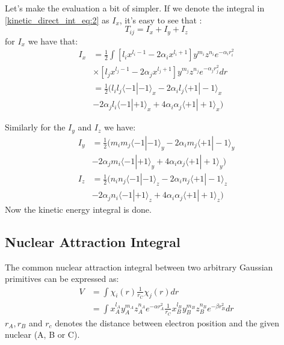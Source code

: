 Let's make the evaluation a bit of simpler. If we denote the integral in \ref{kinetic_direct_int_eq:2} 
as $I_{x}$, it's easy to see that :
\begin{equation}
 T_{ij} = I_{x} + I_{y} + I_{z}
\end{equation}
for $I_{x}$ we have that:
\begin{equation}
 \label{kinetic_direct_int_eq:3}
\begin{split}
 I_{x} &=\frac{1}{2}   \int 
          \left[ l_{i}x^{l_{i}-1} - 2\alpha_{i}x^{l_{i}+1}\right]
          y^{m_{i}}z^{n_{i}}e^{-\alpha_{i} r_{i}^{2}} \\
       &\times
          \left[ l_{j}x^{l_{j}-1} - 2\alpha_{j}x^{l_{j}+1}\right]
          y^{m_{j}}z^{n_{j}}e^{-\alpha_{j} r_{j}^{2}} dr \\
       &= \frac{1}{2}\Big(
          l_{i}l_{j}\langle -1|-1\rangle_{x} 
        - 2\alpha_{i}l_{j}\langle +1|-1\rangle_{x}    \\
       &- 2\alpha_{j}l_{i}\langle -1|+1\rangle_{x}
        + 4\alpha_{i}\alpha_{j}\langle +1|+1\rangle_{x} 
          \Big) 
\end{split}
\end{equation}

Similarly for the $I_{y}$ and $I_{z}$ we have:
\begin{equation}
\label{kinetic_direct_int_eq:4}
\begin{split}
I_{y} &=  \frac{1}{2}\Big(
          m_{i}m_{j}\langle -1|-1\rangle_{y} 
        - 2\alpha_{i}m_{j}\langle +1|-1\rangle_{y}   \\ 
       &- 2\alpha_{j}m_{i}\langle -1|+1\rangle_{y}
        + 4\alpha_{i}\alpha_{j}\langle +1|+1\rangle_{y} 
          \Big) \\
I_{z} &=  \frac{1}{2}\Big(
          n_{i}n_{j}\langle -1|-1\rangle_{z} 
        - 2\alpha_{i}n_{j}\langle +1|-1\rangle_{z}   \\ 
       &- 2\alpha_{j}n_{i}\langle -1|+1\rangle_{z}
        + 4\alpha_{i}\alpha_{j}\langle +1|+1\rangle_{z} 
          \Big) 
\end{split}
\end{equation}
Now the kinetic energy integral is done.

\subsection{Nuclear Attraction Integral}
\label{direct_NAI_derivation}
%
%
%
The common nuclear attraction integral between two arbitrary Gaussian primitives can be expressed
as:
\begin{equation}
 \begin{split}
  V &= \int \chi_{i}(r)\frac{1}{r_{C}}\chi_{j}(r) dr \\
&= \int x^{l_{A}}_{A}y^{m_{A}}_{A}z^{n_{A}}_{A}e^{-\alpha r_{A}^{2}}
        \frac{1}{r_{C}}
        x^{l_{B}}_{B}y^{m_{B}}_{B}z^{n_{B}}_{B}e^{-\beta  r_{B}^{2}} dr
 \end{split}
\label{nuclear_attraction_direct_int_eq:1}
\end{equation}
$r_{A}, r_{B}$ and $r_{c}$ denotes the distance between electron position and the given
nuclear (A, B or C).

